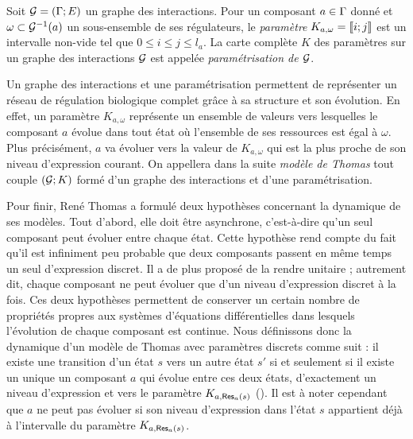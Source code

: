 \begin{definition}
  Soit $\mathcal{G} = (\mathrm{\Gamma}; E)$ un graphe des interactions.
  Pour un composant $a \in \mathrm{\Gamma}$ donné
  et $\omega \subset \mathcal{G}^{-1}(a)$ un sous-ensemble de ses régulateurs,
  le \emph{paramètre} $K_{a,\omega} = \mathopen{\llbracket}i\mathclose{};j\mathclose{\rrbracket}$ est un intervalle non-vide tel que
  $0 \leq i \leq j \leq l_a$.
  La carte complète $K$ des paramètres sur un graphe des interactions $\mathcal{G}$
  est appelée \emph{paramétrisation de $\mathcal{G}$}.
\end{definition}

Un graphe des interactions et une paramétrisation permettent de représenter
un réseau de régulation biologique complet grâce à sa structure et son évolution.
En effet, un paramètre $K_{a,\omega}$ représente un ensemble de valeurs vers lesquelles
le composant $a$ évolue dans tout état où l'ensemble de ses ressources est égal à $\omega$.
Plus précisément, $a$ va évoluer vers la valeur de $K_{a,\omega}$ qui est la plus proche de
son niveau d'expression courant.
On appellera dans la suite \emph{modèle de Thomas} tout couple $(\mathcal{G}; K)$
formé d'un graphe des interactions et d'une paramétrisation.

Pour finir, René Thomas a formulé deux hypothèses concernant la dynamique de ses modèles.
Tout d'abord, elle doit être asynchrone, c'est-à-dire qu'un seul composant peut évoluer
entre chaque état.
Cette hypothèse rend compte du fait qu'il est infiniment peu probable que deux composants passent
en même temps un seul d'expression discret.
Il a de plus proposé de la rendre unitaire ;
autrement dit, chaque composant ne peut évoluer que d'un niveau d'expression discret à la fois.
Ces deux hypothèses permettent de conserver un certain nombre de propriétés propres aux
systèmes d'équations différentielles dans lesquels l'évolution de chaque composant est continue.
Nous définissons donc la dynamique d'un modèle de Thomas avec paramètres discrets comme suit :
il existe une transition d'un état $s$ vers un autre état $s'$ si et seulement si
il existe un unique un composant $a$ qui évolue entre ces deux états,
d'exactement un niveau d'expression et vers le paramètre $K_{a,\mathsf{Res}_{a}(s)}$
().
Il est à noter cependant que $a$ ne peut pas évoluer si son niveau d'expression dans l'état $s$
appartient déjà à l'intervalle du paramètre $K_{a,\mathsf{Res}_{a}(s)}$.

